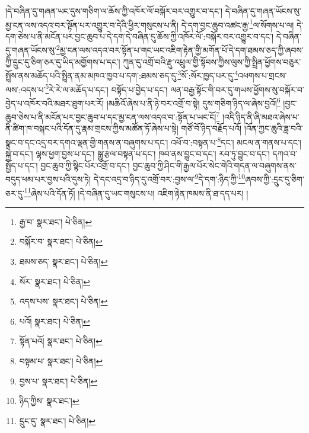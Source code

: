 །དེ་བཞིན་དུ་གཞན་ཡང་དུས་གཅིག་ལ་ཆོས་ཀྱི་འཁོར་ལོ་བསྐོར་བར་འགྱུར་བ་དང་། དེ་བཞིན་དུ་གཞན་ཡོངས་སུ་མྱ་ངན་ལས་འདའ་བར་སྟོན་པར་འགྱུར་བ་དེའི་ཕྱིར་གསུངས་པ་ནི། དེ་དག་བྱང་ཆུབ་འཚང་རྒྱ་\footnote{རྒྱ་བ་  སྣར་ཐང་།  པེ་ཅིན། }ལ་སོགས་པ་ལ། དེ་དག་ཅེས་པ་ནི་མངོན་པར་བྱང་ཆུབ་པ་དེ་དག་དེ་བཞིན་དུ་ཆོས་ཀྱི་འཁོར་ལོ་:བསྐོར་བར་འགྱུར་བ་དང་། དེ་བཞིན་དུ་གཞན་ཡོངས་སུ་\footnote{བསྐོར་བ་  སྣར་ཐང་།  པེ་ཅིན། }མྱ་ངན་ལས་འདའ་བར་སྟོན་པ་གང་ཡང་འཇིག་རྟེན་གྱི་མགོན་པོ་དེ་དག་ཐམས་ཅད་ཀྱི་ཞབས་ཀྱི་དྲུང་དུ་ཅིག་ཅར་དུ་ཡིད་མགྱོགས་པ་དང་། ཀུན་དུ་འགྲོ་བའི་རྫུ་འཕྲུལ་གྱི་སྟོབས་ཀྱིས་ལུས་ཀྱི་སྤྲིན་ཕྱོགས་བཅུར་སྤྲོས་ནས་མཆོད་པའི་སྤྲིན་ནམ་མཁའ་ཁྱབ་པ་དག་:ཐམས་ཅད་དུ་\footnote{ཐམས་ཅད་  སྣར་ཐང་།  པེ་ཅིན། }སོ་:སོར་ཁྱད་པར་དུ་\footnote{སོར་  སྣར་ཐང་།  པེ་ཅིན། }འཕགས་པ་གྲངས་ལས་:འདས་པ་\footnote{འདས་པས་  སྣར་ཐང་།  པེ་ཅིན། }རེ་རེ་ལ་མཆོད་པ་དང་། བསྟོད་པ་བྱེད་པ་དང་། ལན་བརྒྱ་སྟོང་གི་བར་དུ་གཡས་ཕྱོགས་སུ་བསྐོར་བ་བྱེད་པ་འཁོར་བའི་མཐར་ཐུག་པར་རོ། །མཆིའོ་ཞེས་པ་ནི་ཉེ་བར་འགྲོ་བ་སྟེ། དུས་གཅིག་ཉིད་ལ་ཞེས་བྱའོ།\footnote{པའོ།  སྣར་ཐང་།  པེ་ཅིན། } །བྱང་ཆུབ་ཅེས་པ་ནི་མངོན་པར་བྱང་ཆུབ་པ་དང་མྱ་ངན་ལས་འདའ་བ་:སྟོན་པ་ཡང་ངོ།\footnote{སྟོན་པའོ།  སྣར་ཐང་།  པེ་ཅིན། } །འདི་ཉིད་ནི་ཞི་མཐའ་ཞེས་པ་ནི་ཚིག་ཁ་བསྐང་པའི་དོན་དུ་རྣམ་གྲངས་ཀྱིས་མཚོན་ཏོ་ཞེས་པ་སྟེ། གཙོ་བོ་ཉིད་བརྗོད་པའོ། །འོན་ཀྱང་ཆུའི་ཟླ་བའི་སྣང་བ་དང་འདྲ་བར་དགའ་ལྡན་གྱི་གནས་ན་བཞུགས་པ་དང་། འཕོ་བ་:བསྟན་པ་\footnote{བསྟམ་པ་  སྣར་ཐང་།  པེ་ཅིན། }དང་། མངལ་ན་གནས་པ་དང་། སྐྱེ་བ་དང་། ལྷས་ཕྱག་བྱས་པ་དང་། སྒྱུ་རྩལ་བསྟན་པ་དང་། ཁབ་ནས་བྱུང་བ་དང་། རབ་ཏུ་བྱུང་བ་དང་། དཀའ་བ་སྤྱོད་པ་དང་། བྱང་ཆུབ་ཀྱི་སྙིང་པོར་འགྲོ་བ་དང་། བྱང་ཆུབ་ཀྱི་ཤིང་གི་རྒྱལ་པོར་སེང་གེའི་གདན་ལ་བཞུགས་ནས་བདུད་ཕམ་པར་བྱས་པའི་དུས་ཏེ། དེ་དང་འདྲ་བ་ཉིད་དུ་འགྲོ་བར་:བྱས་ལ་\footnote{བྱས་པ་  སྣར་ཐང་།  པེ་ཅིན། }དེ་དག་:ཉིད་ཀྱི་\footnote{ཉིད་ཀྱིས་  སྣར་ཐང་། }ཞབས་ཀྱི་:དྲུང་དུ་ཅིག་ཅར་དུ་\footnote{དྲུང་དུ་  སྣར་ཐང་།  པེ་ཅིན། }ཞེས་པའི་དོན་ཏོ། །དེ་བཞིན་དུ་ཡང་གསུངས་པ། འཇིག་རྟེན་ཁམས་ནི་ཐ་དད་པར། །
